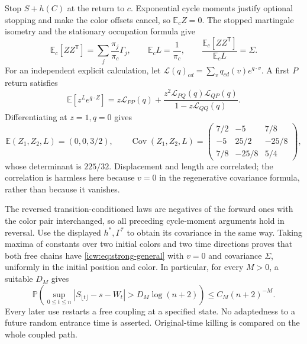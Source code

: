 \documentclass[11pt,letterpaper]{article}
\theoremstyle{remark}\newtheorem{remark}[theorem]{Remark}
\newcommand{\Prob}{\mathbb P}
\newcommand{\E}{\mathbb E}
\newcommand{\1}{\mathbf1}
\begin{document}
Stop $S+h(C)$ at the return to $c$. Exponential cycle moments justify
optional stopping and make the color offsets cancel, so $\E_c Z=0$.
The stopped martingale isometry and the stationary occupation formula
give
\[
 \E_c[ZZ^{\mathsf T}]=\sum_j\frac{\pi_j}{\pi_c}\Gamma_j,
 \qquad \E_cL=\frac1{\pi_c},\qquad
 \frac{\E_c[ZZ^{\mathsf T}]}{\E_cL}=\Sigma.
\]
For an independent explicit calculation, let $\mathcal L(q)_{cd}
=\sum_vq_{cd}(v)e^{q\cdot v}$. A first $P$ return satisfies
\begin{equation}\label{icw:eq:return-transform}
 \E[z^L e^{q\cdot Z}]
 =z\mathcal L_{PP}(q)+
 \frac{z^2\mathcal L_{PQ}(q)\mathcal L_{QP}(q)}{1-z\mathcal L_{QQ}(q)}.
\end{equation}
Differentiating at $z=1,q=0$ gives
\begin{equation}\label{icw:eq:cycle-cov}
 \E(Z_1,Z_2,L)=(0,0,3/2),\qquad
 \operatorname{Cov}(Z_1,Z_2,L)=
 \begin{pmatrix}7/2&-5&7/8\\-5&25/2&-25/8\\7/8&-25/8&5/4\end{pmatrix},
\end{equation}
whose determinant is $225/32$. Displacement and length are correlated;
the correlation is harmless here because $v=0$ in the regenerative
covariance formula, rather than because it vanishes.

The reversed transition-conditioned laws are negatives of the forward
ones with the color pair interchanged, so all preceding cycle-moment
arguments hold in reversal. Use the displayed $h^*,\Gamma^*$ to obtain
its covariance in the same way. Taking maxima of constants over two
initial colors and two time directions proves that both free chains
have \eqref{icw:eq:strong-general} with $v=0$ and covariance $\Sigma$,
uniformly in the initial position and color. In particular, for every
$M>0$, a suitable $D_M$ gives
\begin{equation}\label{icw:eq:coupling}
 \Prob\left(\sup_{0\le t\le n}|S_{\lfloor t\rfloor}-s-W_t|
               >D_M\log(n+2)\right)\le C_M(n+2)^{-M}.
\end{equation}
Every later use restarts a free coupling at a specified state. No
adaptedness to a future random entrance time is asserted. Original-time
killing is compared on the whole coupled path.
\end{document}
